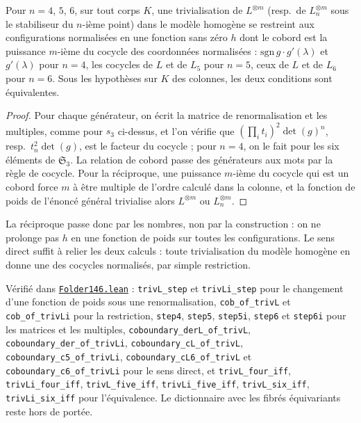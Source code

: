 \begin{encadre}
\begin{enonce}
Pour $n = 4$, $5$, $6$, sur tout corps $K$, une trivialisation de $L^{\otimes m}$ (resp.\ de $L_n^{\otimes m}$ sous le stabiliseur du $n$-ième point) dans le modèle homogène se restreint aux configurations normalisées en une fonction sans zéro $h$ dont le cobord est la puissance $m$-ième du cocycle des coordonnées normalisées : $\mathrm{sgn}\,g \cdot g'(\lambda)$ et $g'(\lambda)$ pour $n = 4$, les cocycles de $L$ et de $L_5$ pour $n = 5$, ceux de $L$ et de $L_6$ pour $n = 6$. Sous les hypothèses sur $K$ des colonnes, les deux conditions sont équivalentes.
\end{enonce}
\end{encadre}

\begin{proof}
Pour chaque générateur, on écrit la matrice de renormalisation et les multiples, comme pour $s_3$ ci-dessus, et l'on vérifie que $(\prod_i t_i)^2 \det(g)^n$, resp.\ $t_n^2\det(g)$, est le facteur du cocycle ; pour $n = 4$, on le fait pour les six éléments de $\mathfrak S_3$. La relation de cobord passe des générateurs aux mots par la règle de cocycle. Pour la réciproque, une puissance $m$-ième du cocycle qui est un cobord force $m$ à être multiple de l'ordre calculé dans la colonne, et la fonction de poids de l'énoncé général trivialise alors $L^{\otimes m}$ ou $L_n^{\otimes m}$.
\end{proof}

La réciproque passe donc par les nombres, non par la construction : on ne prolonge pas $h$ en une fonction de poids sur toutes les configurations. Le sens direct suffit à relier les deux calculs : toute trivialisation du modèle homogène en donne une des cocycles normalisés, par simple restriction.

\begin{sloppypar}
\noindent Vérifié dans \href{\leanblob/AlgebraicGeometry/Folder146.lean}{\texttt{Folder146.\allowbreak{}lean}} : \texttt{trivL\_step} et \texttt{trivLi\_step} pour le changement d'une fonction de poids sous une renormalisation, \texttt{cob\_of\_trivL} et \texttt{cob\_of\_trivLi} pour la restriction, \texttt{step4}, \texttt{step5}, \texttt{step5i}, \texttt{step6} et \texttt{step6i} pour les matrices et les multiples, \texttt{coboundary\_derL\_of\_trivL}, \texttt{coboundary\_der\_of\_trivLi}, \texttt{coboundary\_cL\_of\_trivL}, \texttt{coboundary\_c5\_of\_trivLi}, \texttt{coboundary\_cL6\_of\_trivL} et \texttt{coboundary\_c6\_of\_trivLi} pour le sens direct, et \texttt{trivL\_four\_iff}, \texttt{trivLi\_four\_iff}, \texttt{trivL\_five\_iff}, \texttt{trivLi\_five\_iff}, \texttt{trivL\_six\_iff}, \texttt{trivLi\_six\_iff} pour l'équivalence. Le dictionnaire avec les fibrés équivariants reste hors de portée.
\end{sloppypar}
